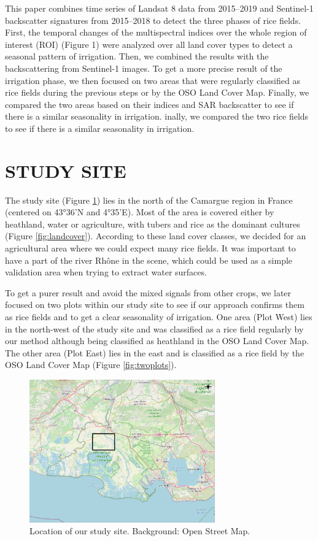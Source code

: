 \documentclass[a4paper, 10pt, conference]{ieeeconf}      %
\begin{document}
This paper combines time series of Landsat 8 data from 2015–2019 and Sentinel-1 backscatter signatures from 2015–2018 to detect the three phases of rice fields. First, the temporal changes of the multispectral indices over the whole region of interest (ROI) (Figure 1) were analyzed over all land cover types to detect a seasonal pattern of irrigation. Then, we combined the results with the backscattering from Sentinel-1 images. To get a more precise result of the irrigation phase, we then focused on two areas that were regularly classified as rice fields during the previous steps or by the OSO Land Cover Map. Finally, we compared the two areas based on their indices and SAR backscatter to see if there is a similar seasonality in irrigation.
inally, we compared the two rice fields to see if there is a similar seasonality in irrigation.

\section{STUDY SITE}

The study site (Figure \ref{fig:studysite}) lies in the north of the Camargue region in France (centered on 43°36'N and 4°35'E). Most of the area is covered either by heathland, water or agriculture, with tubers and rice as the dominant cultures (Figure \ref{fig:landcover}). According to these land cover classes, we decided for an agricultural area where we could expect many rice fields. It was important to have a part of the river Rhône in the scene, which could be used as a simple validation area when trying to extract water surfaces.

To get a purer result and avoid the mixed signals from other crops, we later focused on two plots within our study site to see if our approach confirms them as rice fields and to get a clear seasonality of irrigation. One area (Plot West) lies in the north-west of the study site and was classified as a rice field regularly by our method although being classified as heathland in the OSO Land Cover Map. The other area (Plot East) lies in the east and is classified as a rice field by the OSO Land Cover Map (Figure \ref{fig:twoplots}). 

\begin{figure}[h]
\centering
\includegraphics[width=8cm]{Figures/Study_site.png}
\caption{Location of our study site. Background: Open Street Map.}
\label{fig:studysite}
\end{figure}
\end{document}
